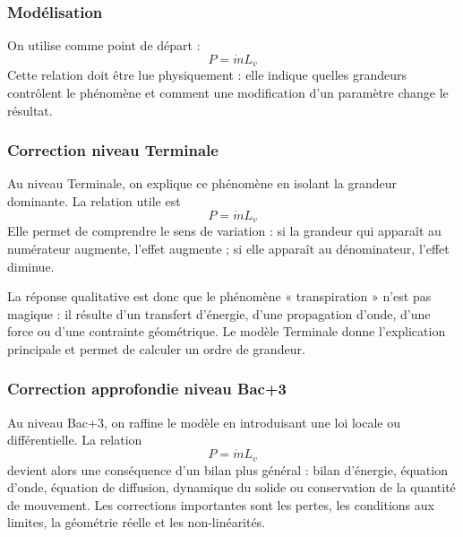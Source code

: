 \documentclass[11pt,a4paper]{article}
\begin{document}
\subsubsection*{Modélisation}

\begin{theorembox}
On utilise comme point de départ :
\[
P=\dot m L_v
\]
Cette relation doit être lue physiquement : elle indique quelles grandeurs contrôlent le phénomène et comment une modification d'un paramètre change le résultat.
\end{theorembox}

\subsubsection*{Correction niveau Terminale}

\begin{corrigebox}

Au niveau Terminale, on explique ce phénomène en isolant la grandeur dominante. La relation utile est
\[
P=\dot m L_v
\]
Elle permet de comprendre le sens de variation : si la grandeur qui apparaît au numérateur augmente, l'effet augmente ; si elle apparaît au dénominateur, l'effet diminue.

La réponse qualitative est donc que le phénomène « transpiration » n'est pas magique : il résulte d'un transfert d'énergie, d'une propagation d'onde, d'une force ou d'une contrainte géométrique. Le modèle Terminale donne l'explication principale et permet de calculer un ordre de grandeur.

\end{corrigebox}

\subsubsection*{Correction approfondie niveau Bac+3}

\begin{approfondissementbox}

Au niveau Bac+3, on raffine le modèle en introduisant une loi locale ou différentielle. La relation
\[
P=\dot m L_v
\]
devient alors une conséquence d'un bilan plus général : bilan d'énergie, équation d'onde, équation de diffusion, dynamique du solide ou conservation de la quantité de mouvement. Les corrections importantes sont les pertes, les conditions aux limites, la géométrie réelle et les non-linéarités.

\end{approfondissementbox}
\end{document}
